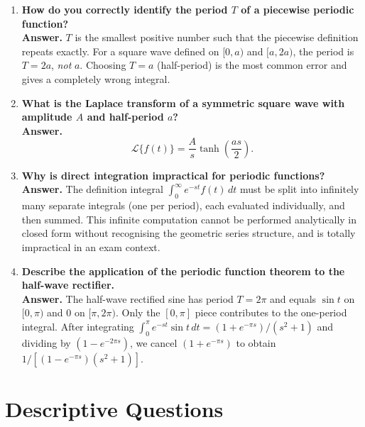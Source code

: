\documentclass[12pt,a4paper]{article}
\begin{document}
\begin{enumerate}[label=\textbf{Q\arabic*.}, leftmargin=*, itemsep=8pt]
\item \textbf{How do you correctly identify the period $T$ of a piecewise
              periodic function?} \\
\textbf{Answer.}  $T$ is the smallest positive number such that the
piecewise definition repeats exactly.  For a square wave defined on
$[0,a)$ and $[a,2a)$, the period is $T = 2a$, \emph{not} $a$.  Choosing
$T = a$ (half-period) is the most common error and gives a completely wrong
integral.

\item \textbf{What is the Laplace transform of a symmetric square wave with
              amplitude $A$ and half-period $a$?} \\
\textbf{Answer.}
\[
  \mathcal{L}\{f(t)\} = \frac{A}{s}\tanh\!\left(\frac{as}{2}\right).
\]

\item \textbf{Why is direct integration impractical for periodic functions?} \\
\textbf{Answer.}  The definition integral $\int_0^\infty e^{-st}f(t)\,dt$
must be split into infinitely many separate integrals (one per period), each
evaluated individually, and then summed.  This infinite computation cannot
be performed analytically in closed form without recognising the geometric
series structure, and is totally impractical in an exam context.

\item \textbf{Describe the application of the periodic function theorem to
              the half-wave rectifier.} \\
\textbf{Answer.}  The half-wave rectified sine has period $T = 2\pi$ and
equals $\sin t$ on $[0,\pi)$ and $0$ on $[\pi, 2\pi)$.  Only the
$[0,\pi]$ piece contributes to the one-period integral.  After integrating
$\int_0^\pi e^{-st}\sin t\,dt = (1+e^{-\pi s})/(s^2+1)$ and dividing by
$(1-e^{-2\pi s})$, we cancel $(1+e^{-\pi s})$ to obtain
$1/[(1-e^{-\pi s})(s^2+1)]$.

\end{enumerate}

\section{Descriptive Questions}
\end{document}
